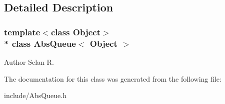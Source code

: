 \subsection{Detailed Description}
\subsubsection*{template$<$class Object$>$\\*
class Abs\+Queue$<$ Object $>$}

\begin{DoxyAuthor}{Author}
Selan R. 
\end{DoxyAuthor}


The documentation for this class was generated from the following file\+:\begin{DoxyCompactItemize}
\item 
include/Abs\+Queue.\+h\end{DoxyCompactItemize}
